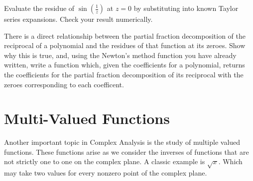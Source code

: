 \begin{problem}
Evaluate the residue of $\sin(\frac{1}{z})$ at $z=0$ by substituting into known Taylor series expansions. Check your result numerically.
\end{problem}

\begin{problem}
There is a direct relationship between the partial fraction decomposition of the reciprocal of a polynomial and the residues of that function at its zeroes. Show why this is true, and, using the Newton's method function you have already written, write a function which, given the coefficients for a polynomial, returns the coefficients for the partial fraction decomposition of its reciprocal with the zeroes corresponding to each coefficent.
\end{problem}
 
\section*{Multi-Valued Functions}

Another important topic in Complex Analysis is the study of multiple valued functions. These functions arise as we consider the inverses of functions that are not strictly one to one on the complex plane. A classic example is $\sqrt{x}$. Which may take two values for every nonzero point of the complex plane.

